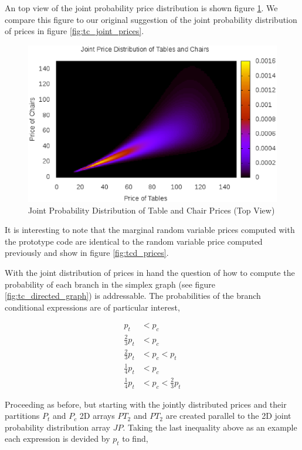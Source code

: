 An top view of the joint probability price distribution is shown figure \ref{fig:Ptc_flat}. We compare this figure to our original suggestion of the joint probability distribution of prices in figure \ref{fig:tc_joint_prices}. 

\begin{figure}
  \centering
  \includegraphics[width=120mm]{Images/Ptc_flat.eps}
  \caption[Joint Probability Distribution of Table and Chair Prices (Top View)]
          {Joint Probability Distribution of Table and Chair Prices (Top View)}
  \label{fig:Ptc_flat}
\end{figure}

It is interesting to note that the marginal random variable prices computed with the prototype code are identical to the random variable price computed previously and show in figure \ref{fig:tcd_prices}.

With the joint distribution of prices in hand the question of how to compute the probability of each branch in the simplex graph (see figure \ref{fig:tc_directed_graph}) is addressable. The probabilities of the branch conditional expressions are of particular interest,

\begin{align*}
p_t &< p_c\\
\frac{2}{3}p_t &< p_c\\
\frac{2}{3}p_t &< p_c < p_t\\
\frac{1}{4}p_t &< p_c\\
\frac{1}{4}p_t &< p_c < \frac{2}{3}p_t
\end{align*}

Proceeding as before, but starting with the jointly distributed prices and their partitions $P_t$ and $P_c$ 2D arrays $PT_2$ and $PT_2$ are created parallel to the 2D joint probability distribution array $JP$. Taking the last inequality above as an example each expression is devided by $p_t$ to find,

